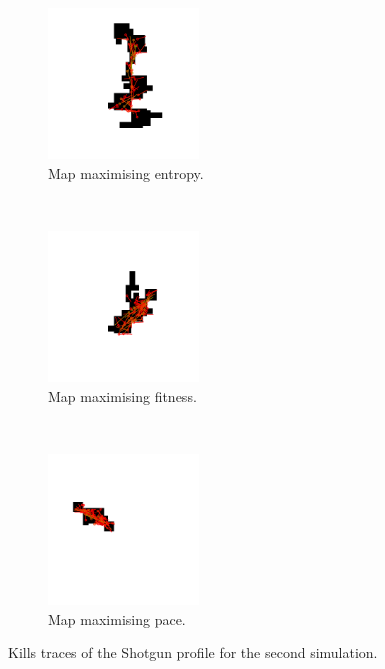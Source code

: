 \begin{figure}[H]
    \centering
    \begin{subfigure}[t]{0.3\textwidth}
        \centering
        \includegraphics[height=4.0cm]{Images/images/experiment_two/best_entropy_pop_1/kill_traces_bot_0.png}
        \caption{Map maximising entropy.}
    \end{subfigure}%
    ~ 
    \begin{subfigure}[t]{0.3\textwidth}
        \centering
        \includegraphics[height=4.0cm]{Images/images/experiment_two/best_fitness_pop_1/kill_traces_bot_0.png}
        \caption{Map maximising fitness.}
    \end{subfigure}
    ~ 
    \begin{subfigure}[t]{0.3\textwidth}
        \centering
        \includegraphics[height=4.0cm]{Images/images/experiment_two/best_pace_pop_1/kill_traces_bot_0.png}
        \caption{Map maximising pace.}
    \end{subfigure}
    \caption{Kills traces of the Shotgun profile for the second simulation.}
\end{figure}

\newpage

